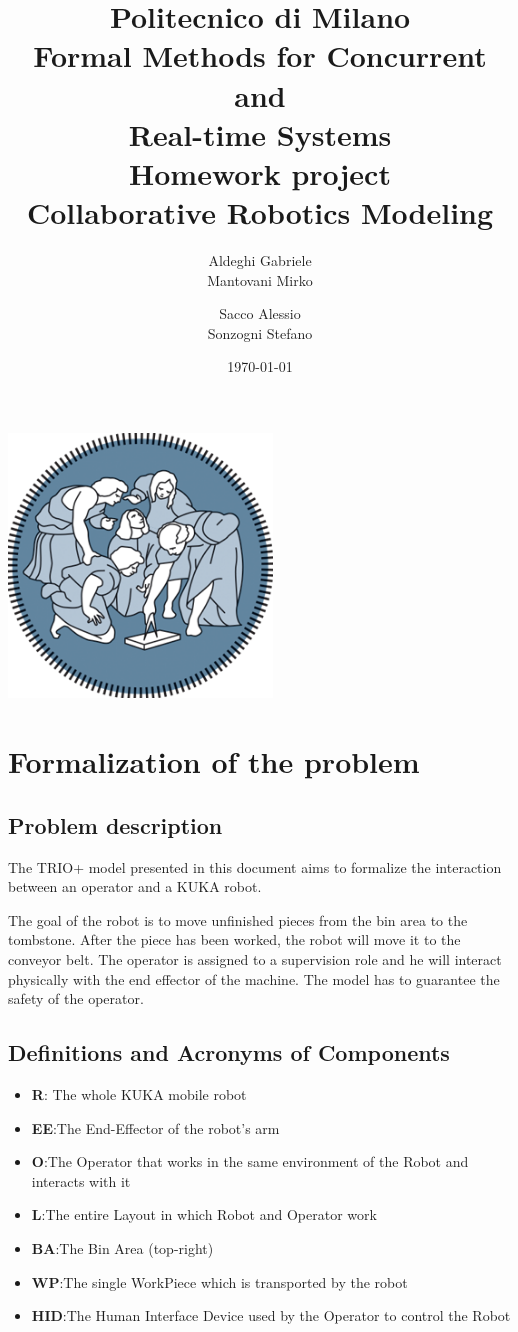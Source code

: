 \documentclass[a4paper]{article}
\title{Politecnico di Milano\\
Formal Methods for Concurrent \\
and \\
Real-time Systems\\
Homework project\\
\textbf{Collaborative Robotics Modeling }}
\author{Aldeghi Gabriele \\
  Mantovani Mirko \and
  Sacco Alessio \\
  Sonzogni Stefano}
\date{\today}
\begin{document}
\maketitle
\begin{center}
    \includegraphics[width=7cm]{images/polimi-logo}
\end{center}
\clearpage
{\hypersetup{hidelinks}\tableofcontents}
\clearpage

\section{Formalization of the problem}
\subsection{Problem description}
The TRIO+ model presented in this document aims to formalize the interaction between an operator and a KUKA robot.

The goal of the robot is to move unfinished pieces from the bin area to the tombstone. After the piece has been worked, the robot will move it to the conveyor belt.
The operator is assigned to a supervision role and he will interact physically with the end effector of the machine. The model has to guarantee the safety of the operator.

\subsection{Definitions and Acronyms of Components}
\begin{itemize}
    \item \textbf{R}: The whole KUKA mobile robot
    \item \textbf{EE}:\@ The End-Effector of the robot's arm
    \item \textbf{O}:\@ The Operator that works in the same environment of the Robot and interacts with it
    \item \textbf{L}:\@ The entire Layout in which Robot and Operator work
    \item \textbf{BA}:\@ The Bin Area (top-right)
    \item \textbf{WP}:\@ The single WorkPiece which is transported by the robot
    \item \textbf{HID}:\@ The Human Interface Device used by the Operator to control the Robot
\end{itemize}
\end{document}
